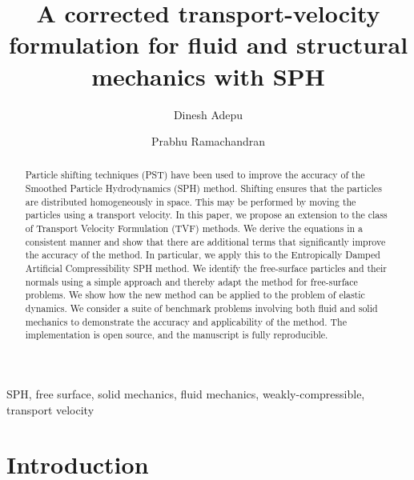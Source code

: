 \documentclass[preprint,12pt]{elsarticle}
\begin{document}
\begin{frontmatter}

  \title{A corrected transport-velocity formulation for fluid and structural mechanics with SPH}
  \author[IITB]{Dinesh Adepu}
  \author[IITB]{Prabhu Ramachandran}
\address[IITB]{Department of Aerospace Engineering, Indian Institute of
  Technology Bombay, Powai, Mumbai 400076}


\begin{abstract}
  Particle shifting techniques (PST) have been used to improve the accuracy of
  the Smoothed Particle Hydrodynamics (SPH) method. Shifting ensures that the
  particles are distributed homogeneously in space. This may be performed by
  moving the particles using a transport velocity. In this paper, we propose an
  extension to the class of Transport Velocity Formulation (TVF) methods. We
  derive the equations in a consistent manner and show that there are
  additional terms that significantly improve the accuracy of the method. In
  particular, we apply this to the Entropically Damped Artificial
  Compressibility SPH method. We identify the free-surface particles and their
  normals using a simple approach and thereby adapt the method for
  free-surface problems. We show how the new method can be applied to the
  problem of elastic dynamics. We consider a suite of benchmark problems
  involving both fluid and solid mechanics to demonstrate the accuracy and
  applicability of the method. The implementation is open source, and the
  manuscript is fully reproducible.
\end{abstract}

\begin{keyword}
{SPH}, {free surface}, {solid mechanics}, {fluid mechanics},
{weakly-compressible}, {transport velocity}


\end{keyword}

\end{frontmatter}


\section{Introduction}
\label{sec:intro}
\end{document}
